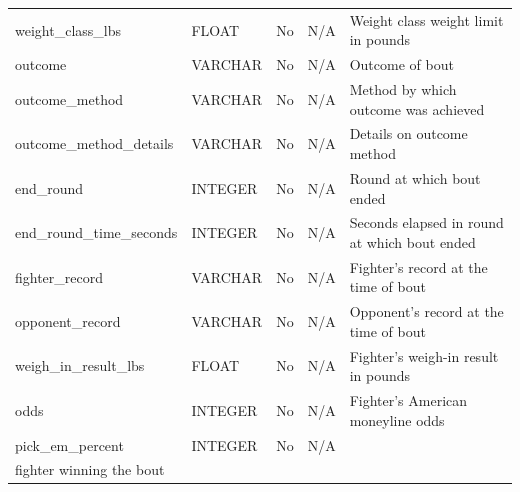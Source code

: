 \documentclass[12pt,twoside]{report}
\begin{document}
\begin{longtable}{lllll}
weight\_class\_lbs        & FLOAT     & No          & N/A                   & Weight class weight limit in pounds                                                                         \\
outcome                   & VARCHAR   & No          & N/A                   & Outcome of bout                                                                                             \\
outcome\_method           & VARCHAR   & No          & N/A                   & Method by which outcome was achieved                                                                        \\
outcome\_method\_details  & VARCHAR   & No          & N/A                   & Details on outcome method                                                                                   \\
end\_round                & INTEGER   & No          & N/A                   & Round at which bout ended                                                                                   \\
end\_round\_time\_seconds & INTEGER   & No          & N/A                   & Seconds elapsed in round at which bout ended                                                                \\
fighter\_record           & VARCHAR   & No          & N/A                   & Fighter's record at the time of bout                                                                        \\
opponent\_record          & VARCHAR   & No          & N/A                   & Opponent's record at the time of bout                                                                       \\
weigh\_in\_result\_lbs    & FLOAT     & No          & N/A                   & Fighter's weigh-in result in pounds                                                                         \\
odds                      & INTEGER   & No          & N/A                   & Fighter's American moneyline odds                                                                           \\
pick\_em\_percent         & INTEGER   & No          & N/A                   & \begin{tabular}[c]{@{}l@{}}Percentage of community picks having the\\fighter winning the bout\end{tabular}  \\
\bottomrule
\end{longtable}
\normalsize
\end{document}
